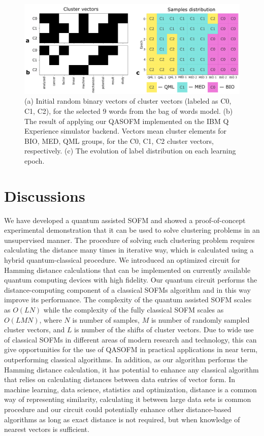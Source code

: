 \documentclass[pra,showkeys,twocolumn,showpacs]{revtex4-1}
\begin{document}
\begin{figure}[t]
	\includegraphics[width=0.95\columnwidth]{convergence.png}
	\caption{
		(a) Initial random binary vectors of cluster vectors (labeled as C0, C1, C2), 
		for the selected 9 words from the bag of words model. 
		(b) The result of applying our QASOFM implemented on the IBM Q Experience simulator backend. 
		Vectors mean cluster elements for BIO, MED, QML groups, 
		for the C0, C1, C2 cluster vectors, respectively. 
		(c) The evolution of label distribution on each learning epoch.
	} 
	\label{convergence}
\end{figure}



\section{Discussions}
We have developed a quantum assisted SOFM and showed a proof-of-concept experimental demonstration 
that it can be used to solve clustering problems in an unsupervised manner.  
The procedure of solving such clustering problem requires calculating the distance many times in iterative way, 
which is calculated using a hybrid quantum-classical procedure.  
We introduced an optimized circuit for Hamming distance calculations that can be implemented on currently available quantum computing devices with high fidelity. 
Our quantum circuit performs the distance-computing component of a classical SOFMs algorithm 
and in this way improve its performance. 
The complexity of the quantum assisted SOFM scales as $O(LN)$ 
while the complexity of the fully classical SOFM scales as $O(LMN)$, 
where $N$ is number of samples, $M$ is number of randomly sampled cluster vectors, 
and $L$ is number of the shifts of cluster vectors.
Due to wide use of classical SOFMs in different areas of modern research and technology, 
this can give opportunities for the use of QASOFM in practical applications in near term, outperforming classical algorithms. 
In addition, as our algorithm performs the Hamming distance calculation, 
it has potential to enhance any classical algorithm that relies on calculating distances between data entries of vector form. 
In machine learning, data science, statistics and optimization, distance is a common way of representing similarity, calculating it between large data sets is common procedure 
and our circuit could potentially enhance other distance-based algorithms as long as exact distance is not required, 
but when knowledge of nearest vectors is sufficient.
\end{document}
